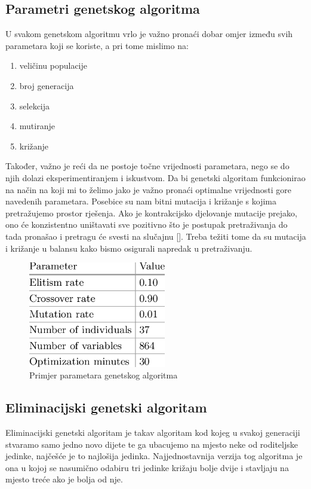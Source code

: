 \documentclass[times, utf8, zavrsni]{fer}
\begin{document}
\subsection{Parametri genetskog algoritma}

U svakom genetskom algoritmu vrlo je važno pronaći dobar omjer između svih parametara koji se koriste, a pri tome mislimo na:
\begin{enumerate}
	\item veličinu populacije
	\item broj generacija
	\item selekcija
	\item mutiranje
	\item križanje
\end{enumerate}

Također, važno je reći da ne postoje točne vrijednosti parametara, nego se do njih dolazi eksperimentiranjem i iskustvom. Da bi genetski algoritam funkcionirao na način na koji mi to želimo jako je važno pronaći optimalne vrijednosti gore navedenih parametara. Posebice su nam bitni mutacija i križanje s kojima pretražujemo prostor rješenja. Ako je kontrakcijsko djelovanje mutacije prejako, ono će konzistentno uništavati sve pozitivno što je postupak pretraživanja do tada pronašao i pretragu će svesti na slučajnu [\citep{UI}]. Treba težiti tome da su mutacija i križanje u balansu kako bismo osigurali napredak u pretraživanju. 


\begin{figure}[!htb]
	\centering
	\includegraphics[width=6cm]{slike/genAlgParams.png}
	\caption{Primjer parametara genetskog algoritma}
	\label{fig:gen-params}

\end{figure}


\subsection{Eliminacijski genetski algoritam}

Eliminacijski genetski algoritam je takav algoritam kod kojeg u svakoj generaciji stvaramo samo jedno novo dijete te ga ubacujemo na mjesto neke od roditeljske jedinke, najčešće je to najlošija jedinka. Najjednostavnija verzija tog algoritma je ona u kojoj se nasumično odabiru tri jedinke križaju bolje dvije i stavljaju na mjesto treće ako je bolja od nje.
\end{document}
